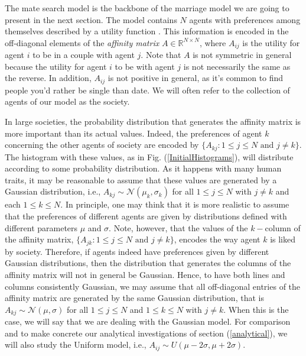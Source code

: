 \documentclass[12pt]{article}
\begin{document}
The mate search model is the backbone of the marriage model we are going to present in the next section. The model contains $N$ agents with preferences among themselves described by a utility function \cite{mas1995microeconomic}. This information is encoded in the off-diagonal elements of the \textit{affinity matrix} $A\in\mathbb{R}^{N\times N}$, where $A_{ij}$ is the utility for agent $i$ to be in a couple with agent $j$. Note that $A$ is not symmetric in general because the utility for agent $i$ to be with agent $j$ is not necessarily the same as the reverse. In addition, $A_{ij}$ is not positive in general, as it's common to find people you'd rather be single than date. %
We will often refer to the collection of agents of our model as the society.

In large societies, the probability distribution that generates the affinity matrix is more important than its actual values. Indeed, the preferences of agent $k$ concerning the other agents of society are encoded by $\{A_{kj}:1\leq j\leq N\textrm{ and } j\neq k\}$. The histogram with these values, as in Fig. (\ref{InitialHistograms}), will distribute according to some probability distribution. As it happens with many human traits, it may be reasonable to assume that these values are generated by a Gaussian distribution, i.e., $A_{kj}\sim\mathcal{N}(\mu_k,\sigma_k)$ for all $1\leq j\leq N$ with $j\neq k$ and each $1\leq k\leq N$. In principle, one may think that it is more realistic to assume that the preferences of different agents are given by distributions defined with different parameters $\mu$ and $\sigma$. Note, however, that the values of the $k-$column of the affinity matrix, $\{A_{jk}:1\leq j\leq N\textrm{ and } j\neq k\}$, encodes the way agent $k$ is liked by society. Therefore, if agents indeed have preferences given by different Gaussian distributions, then the distribution that generates the columns of the affinity matrix will not in general be Gaussian. Hence, to have both lines and columns consistently Gaussian, we may assume that all off-diagonal entries of the affinity matrix are generated by the same Gaussian distribution, that is $A_{kj}\sim\mathcal{N}(\mu,\sigma)$ for all $1\leq j\leq N$ and $1\leq k\leq N$ with $j\neq k$. When this is the case, we will say that we are dealing with the Gaussian model. For comparison and to make concrete our analytical investigations of section (\ref{analytical}), we will also study the Uniform model, i.e., $A_{ij}\sim U(\mu-2\sigma,\mu+2\sigma)$.%
\end{document}
